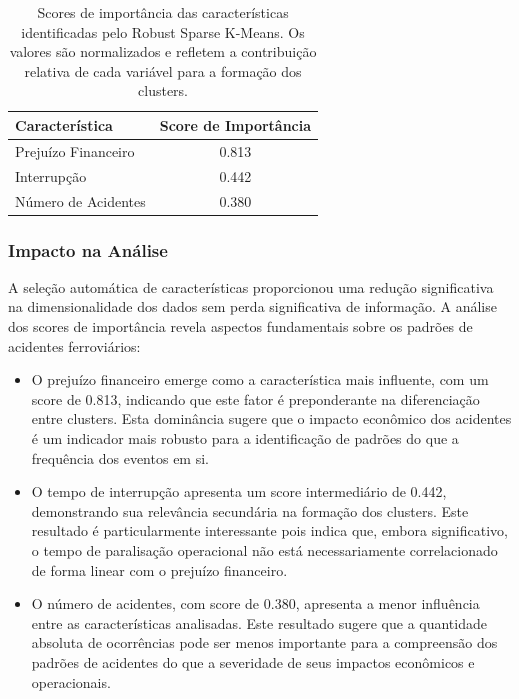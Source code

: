 \documentclass[conference]{IEEEtran}
\begin{document}
\begin{table}[!htb]
\centering
\begin{tabular}{|l|c|}
\hline
\textbf{Característica} & \textbf{Score de Importância} \\
\hline
Prejuízo Financeiro & 0.813 \\
Interrupção & 0.442 \\
Número de Acidentes & 0.380 \\
\hline
\end{tabular}
\caption{Scores de importância das características identificadas pelo Robust Sparse K-Means. Os valores são normalizados e refletem a contribuição relativa de cada variável para a formação dos clusters.}
\label{tab:feature_scores}
\end{table}

\subsubsection{Impacto na Análise}
A seleção automática de características proporcionou uma redução significativa na dimensionalidade dos dados sem perda significativa de informação. A análise dos scores de importância revela aspectos fundamentais sobre os padrões de acidentes ferroviários:

\begin{itemize}

\item O prejuízo financeiro emerge como a característica mais influente, com um score de 0.813, indicando que este fator é preponderante na diferenciação entre clusters. Esta dominância sugere que o impacto econômico dos acidentes é um indicador mais robusto para a identificação de padrões do que a frequência dos eventos em si.

\item O tempo de interrupção apresenta um score intermediário de 0.442, demonstrando sua relevância secundária na formação dos clusters. Este resultado é particularmente interessante pois indica que, embora significativo, o tempo de paralisação operacional não está necessariamente correlacionado de forma linear com o prejuízo financeiro.

\item O número de acidentes, com score de 0.380, apresenta a menor influência entre as características analisadas. Este resultado sugere que a quantidade absoluta de ocorrências pode ser menos importante para a compreensão dos padrões de acidentes do que a severidade de seus impactos econômicos e operacionais.

\end{itemize}
\end{document}
